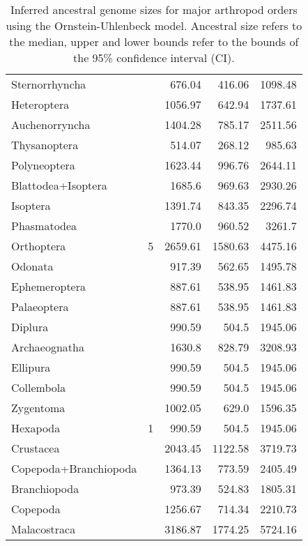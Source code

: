 \begin{table}[h!]
\begin{tabular}{lrrrr}
Sternorrhyncha &  & 676.04 & 416.06 & 1098.48 \\
Heteroptera &  & 1056.97 & 642.94 & 1737.61 \\
Auchenorryncha &  & 1404.28 & 785.17 & 2511.56 \\
Thysanoptera &  & 514.07 & 268.12 & 985.63 \\
Polyneoptera &  & 1623.44 & 996.76 & 2644.11 \\
Blattodea+Isoptera &  & 1685.6 & 969.63 & 2930.26 \\
Isoptera &  & 1391.74 & 843.35 & 2296.74 \\
Phasmatodea &  & 1770.0 & 960.52 & 3261.7 \\
Orthoptera & 5 & 2659.61 & 1580.63 & 4475.16 \\
Odonata &  & 917.39 & 562.65 & 1495.78 \\
Ephemeroptera &  & 887.61 & 538.95 & 1461.83 \\
Palaeoptera &  & 887.61 & 538.95 & 1461.83 \\
Diplura &  & 990.59 & 504.5 & 1945.06 \\
Archaeognatha &  & 1630.8 & 828.79 & 3208.93 \\
Ellipura &  & 990.59 & 504.5 & 1945.06 \\
Collembola &  & 990.59 & 504.5 & 1945.06 \\
Zygentoma &  & 1002.05 & 629.0 & 1596.35 \\
Hexapoda & 1 & 990.59 & 504.5 & 1945.06 \\
Crustacea &  & 2043.45 & 1122.58 & 3719.73 \\
Copepoda+Branchiopoda &  & 1364.13 & 773.59 & 2405.49 \\
Branchiopoda &  & 973.39 & 524.83 & 1805.31 \\
Copepoda &  & 1256.67 & 714.34 & 2210.73 \\
Malacostraca &  & 3186.87 & 1774.25 & 5724.16 \\
\end{tabular}
\caption[Inferred ancestral genome size for major arthropod orders]{{Inferred ancestral genome sizes for major arthropod orders using the
Ornstein-Uhlenbeck model. Ancestral size refers to the median, upper and
lower bounds refer to the bounds of the 95\% confidence interval (CI).
{\label{984909}}%
}}
\end{table}

